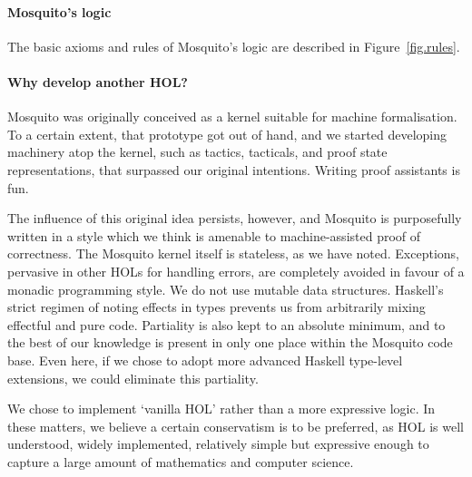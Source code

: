 \documentclass{llncs}
\newcommand{\mosquito}{Mosquito\xspace}
\begin{document}
\paragraph{\mosquito's logic}
The basic axioms and rules of \mosquito's logic are described in Figure~\ref{fig.rules}.

\paragraph{Why develop another HOL?}
\mosquito was originally conceived as a kernel suitable for machine formalisation.
To a certain extent, that prototype got out of hand, and we started developing machinery atop the kernel, such as tactics, tacticals, and proof state representations, that surpassed our original intentions.
Writing proof assistants is fun.

The influence of this original idea persists, however, and \mosquito is purposefully written in a style which we think is amenable to machine-assisted proof of correctness.
The \mosquito kernel itself is stateless, as we have noted.
Exceptions, pervasive in other HOLs for handling errors, are completely avoided in favour of a monadic programming style.
We do not use mutable data structures.
Haskell's strict regimen of noting effects in types prevents us from arbitrarily mixing effectful and pure code.
Partiality is also kept to an absolute minimum, and to the best of our knowledge is present in only one place within the \mosquito code base.
Even here, if we chose to adopt more advanced Haskell type-level extensions, we could eliminate this partiality.

We chose to implement `vanilla HOL' rather than a more expressive logic.
In these matters, we believe a certain conservatism is to be preferred, as HOL is well understood, widely implemented, relatively simple but expressive enough to capture a large amount of mathematics and computer science.
\end{document}
